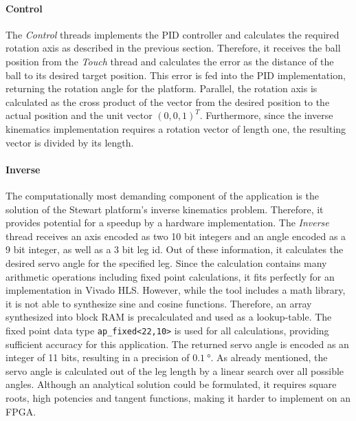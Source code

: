 \paragraph{Control} The \emph{Control} threads implements the \ac{PID}
controller and calculates the required rotation axis as described in the
previous section. Therefore, it receives the ball position from the
\emph{Touch} thread and calculates the error as the distance of the ball to
its desired target position. This error is fed into the \ac{PID}
implementation, returning the rotation angle for the platform. Parallel, the
rotation axis is calculated as the cross product of the vector from the
desired position to the actual position and the unit vector $(0,0,1)^T$.
Furthermore, since the inverse kinematics implementation requires a rotation
vector of length one, the resulting vector is divided by its length.

\paragraph{Inverse} The computationally most demanding component of the
application is the solution of the Stewart platform's inverse kinematics
problem. Therefore, it provides  potential for a speedup by a hardware
implementation. The \emph{Inverse} thread receives an axis encoded as two 10
bit integers and an angle encoded as a 9 bit integer, as well as a 3 bit leg
id. Out of these information, it calculates the desired servo angle for the
specified leg. Since the calculation contains many arithmetic operations
including fixed point calculations, it fits perfectly for an implementation in
Vivado HLS. However, while the tool includes a math library, it is not able to
synthesize sine and cosine functions. Therefore, an array synthesized into
block \ac{RAM} is precalculated and used as a lookup-table. The fixed point
data type \lstinline{ap_fixed<22,10>} is used for all calculations, providing
sufficient accuracy for this application. The returned servo angle is encoded
as an integer of 11 bits, resulting in a precision of $\SI{0.1}{\degree}$. As
already mentioned, the servo angle is calculated out of the leg length by a
linear search over all possible angles. Although an analytical solution could
be formulated, it requires square roots, high potencies and tangent functions,
making it harder to implement on an FPGA.

